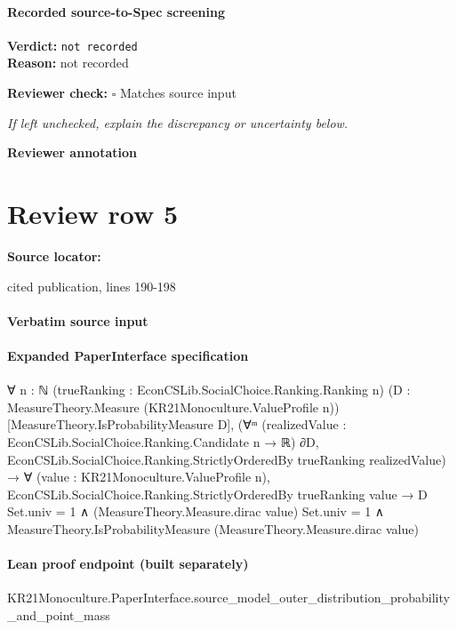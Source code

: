 \documentclass[10pt]{article}
\newcommand{\reviewerbox}{%
  \par\noindent\fbox{\parbox{0.96\linewidth}{\rule{0pt}{0.38in}}}\par
}
\newcommand{\reviewmatch}[1]{%
  \par\noindent\textbf{Reviewer check:} $\square$\; #1\par
  \noindent\emph{If left unchecked, explain the discrepancy or uncertainty below.}\par
}
\begin{document}
\paragraph{Recorded source-to-Spec screening}
\textbf{Verdict:} \texttt{not recorded}
\\
\textbf{Reason:} not recorded
\reviewmatch{Matches source input}
\noindent\textbf{Reviewer annotation}\par
\reviewerbox
\clearpage
\hypertarget{source-claim-fcc1dae9c26a2b31}{}
\section*{Review row 5}
\textbf{Source locator:} {\footnotesize\raggedright cited publication, lines 190-\allowbreak{}198\par}
\paragraph{Verbatim source input}
\begin{ReviewVerbatim}
\end{ReviewVerbatim}


\paragraph{Expanded PaperInterface specification}
\begin{ReviewVerbatim}
∀ {n : ℕ} (trueRanking : EconCSLib.SocialChoice.Ranking.Ranking n)
  (D : MeasureTheory.Measure (KR21Monoculture.ValueProfile n)) [MeasureTheory.IsProbabilityMeasure D],
  (∀ᵐ (realizedValue : EconCSLib.SocialChoice.Ranking.Candidate n → ℝ) ∂D,
      EconCSLib.SocialChoice.Ranking.StrictlyOrderedBy trueRanking realizedValue) →
    ∀ (value : KR21Monoculture.ValueProfile n),
      EconCSLib.SocialChoice.Ranking.StrictlyOrderedBy trueRanking value →
        D Set.univ = 1 ∧
          (MeasureTheory.Measure.dirac value) Set.univ = 1 ∧
            MeasureTheory.IsProbabilityMeasure (MeasureTheory.Measure.dirac value)
\end{ReviewVerbatim}

\paragraph{Lean proof endpoint (built separately)}\begin{ReviewVerbatim}
KR21Monoculture.PaperInterface.source_model_outer_distribution_probability_and_point_mass
\end{ReviewVerbatim}
\end{document}

